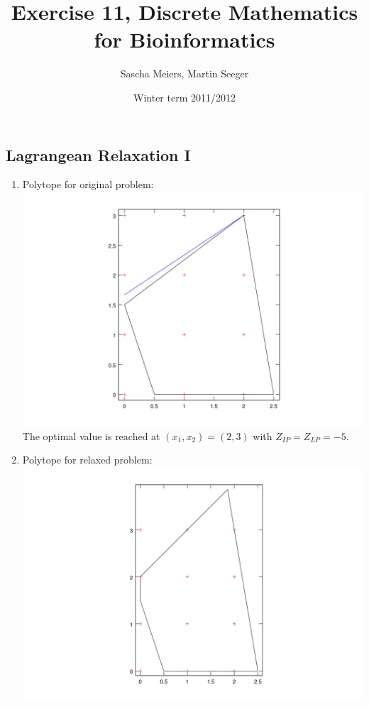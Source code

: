 \documentclass[a4paper, oneside]{scrartcl}
\author{Sascha Meiers, Martin Seeger}
\title{Exercise 11, Discrete Mathematics for Bioinformatics}
\date{Winter term 2011/2012}
\begin{document}
\maketitle


\subsection{Lagrangean Relaxation I}

\renewcommand{\labelenumi}{\alph{enumi})}
\begin{enumerate}
  \item Polytope for original problem:\\
\includegraphics[width=\textwidth]{ex11_1_a_good.png}
The optimal value is reached at $(x_1, x_2)=(2, 3)$ with $Z_{IP}=Z_{LP}=-5$.
  \item Polytope for relaxed problem:\\
\includegraphics[width=\textwidth]{ex11_1_b_good.png}\\

\end{enumerate}
\end{document}
